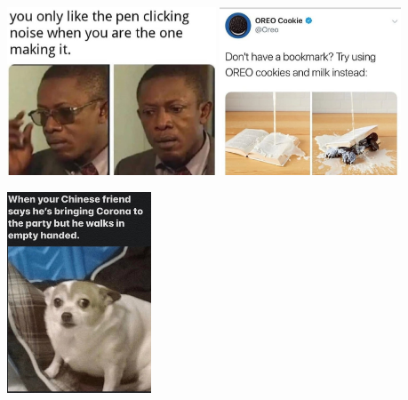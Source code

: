 \documentclass{article}
\begin{document}
\begin{center}
\includegraphics[height=5cm]{m1.jpeg}
\includegraphics[height=5cm]{m4.jpeg}

\includegraphics[height=6cm]{m2.jpeg}

\end{center}

\pagebreak


\end{document}
